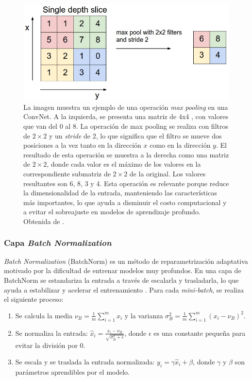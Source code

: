 \begin{figure}
    \centering
    \includegraphics[width=0.75\linewidth]{Plantilla_TFG_latex//imagenes//Inf//2.Fund/maxpool.jpeg}
    \caption[Ejemplo de una operación \textit{max pooling} en una red convolucional]{La imagen muestra un ejemplo de una operación \textit{max pooling} en una ConvNet. A la izquierda, se presenta una matriz de 4x4 , con valores que van del 0 al 8. La operación de max pooling se realiza con filtros de $2\times 2$ y un \textit{stride} de 2, lo que significa que el filtro se mueve dos posiciones a la vez tanto en la dirección $x$ como en la dirección $y$. El resultado de esta operación se muestra a la derecha como una matriz de $2\times 2$, donde cada valor es el máximo de los valores en la correspondiente submatriz de $2\times 2$ de la original. Los valores resultantes son 6, 8, 3 y 4. Esta operación es relevante porque reduce la dimensionalidad de la entrada, manteniendo las características más importantes, lo que ayuda a disminuir el costo computacional y a evitar el sobreajuste en modelos de aprendizaje profundo. Obtenida de \cite{stanford_231}.}
    \label{fig:pooling}
\end{figure}

\subsubsection{Capa \textit{Batch Normalization}}

\textit{Batch Normalization} (BatchNorm) \cite{batchnorm} es un método de reparametrización adaptativa motivado por la dificultad de entrenar modelos muy profundos. En una capa de BatchNorm se estandariza la entrada a través de escalarla y trasladarla, lo que ayuda a estabilizar y acelerar el entrenamiento \cite{stanford_231}. Para cada \textit{mini-batch}, se realiza el siguiente proceso:

\begin{enumerate}

	\item Se calcula la media $\nu_{B}= \frac{1}{m} \sum_{i=1}^{m}x_i$ y la varianza $\sigma^{2}_B=\frac{1}{m} \sum_{i=1}^m(x_i - \nu_B)^2$.
	
	\item Se normaliza la entrada: $\hat{x}_i = \frac{x_i - \nu_B}{\sqrt{\sigma^{2}_B + \epsilon}}$, donde $\epsilon$ es una constante pequeña para evitar la división por 0.
	
	\item Se escala y se traslada la entrada normalizada: $y_i=\gamma \hat{x}_i + \beta$, donde $\gamma$ y $\beta$ son parámetros aprendibles por el modelo.
\end{enumerate}

